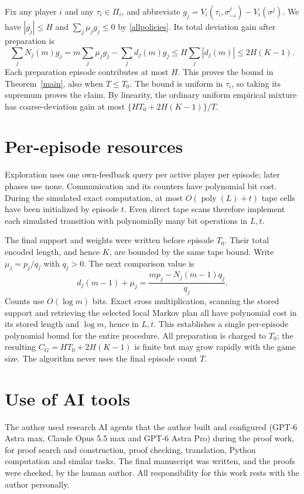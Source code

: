 \documentclass[11pt]{article}
\begin{document}
\newpage
Fix any player $i$ and any $\tau_i\in\Pi_i$, and abbreviate
$g_j=V_i(\tau_i,\sigma^j_{-i})-V_i(\sigma^j)$.
We have $|g_j|\leq H$ and $\sum_j\mu_jg_j\leq0$ by
\eqref{allpolicies}. Its total deviation gain after preparation is
\[
 \sum_jN_j(m)g_j
   =m\sum_j\mu_jg_j-\sum_jd_j(m)g_j
   \leq H\sum_j|d_j(m)|\leq2H(K-1).
\]
Each preparation episode contributes at most $H$. This proves the bound
in Theorem~\ref{main}, also when $T\leq T_0$. The bound is uniform in
$\tau_i$, so taking its supremum proves the claim. By linearity, the
ordinary uniform empirical mixture has coarse-deviation gain at most
$\{H T_0+2H(K-1)\}/T$.

\section{Per-episode resources}
Exploration uses one own-feedback query per active player per episode;
later phases use none. Communication and its counters have polynomial
bit cost. During the simulated exact computation, at most
$O(\operatorname{poly}(L)+t)$ tape cells have been initialized by episode
$t$. Even direct tape scans therefore implement each simulated transition
with polynomially many bit operations in $L,t$.

The final support and weights were written before episode $T_0$.
Their total encoded length, and hence $K$, are bounded by the same tape
bound. Write $\mu_j=p_j/q_j$ with $q_j>0$. The next comparison value is
\[
          d_j(m-1)+\mu_j
             =\frac{m p_j-N_j(m-1)q_j}{q_j}.
\]
Counts use $O(\log m)$ bits. Exact cross multiplication, scanning the
stored support and retrieving the selected local Markov plan all have
polynomial cost in its stored length and $\log m$, hence in $L,t$.
This establishes a single per-episode polynomial bound for the entire
procedure. All preparation is charged to $T_0$; the resulting
$C_G=H T_0+2H(K-1)$ is finite but may grow rapidly with the game size.
The algorithm never uses the final episode count $T$.

\section*{Use of AI tools}
The author used research AI agents that the author built and configured (GPT-6 Astra max,
Claude Opus 5.5 max and GPT-6 Astra Pro) during the proof work, for proof search and
construction, proof checking, translation, Python computation and similar tasks. The final
manuscript was written, and the proofs were checked, by the human author. All responsibility
for this work rests with the author personally.
\end{document}

